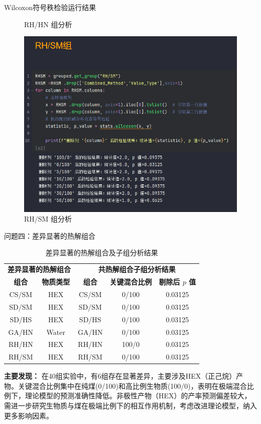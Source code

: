 \documentclass{beamer}
\begin{document}
\begin{frame}{Wilcoxon符号秩检验运行结果}
\begin{figure}[htbp]
\begin{minipage}{0.3\linewidth}
            \caption{RH/HN 组分析}
        \end{minipage}
        \begin{minipage}{0.3\linewidth}
            \centering
            \includegraphics[width=\linewidth]{pic/path_to_image7.png} %
            \caption{RH/SM 组分析}
        \end{minipage}        
    \end{figure}
\end{frame}


\begin{frame}{问题四：差异显著的热解组合}
\centering
\begin{table}[htbp]
\scriptsize
\setlength{\tabcolsep}{4pt}
\begin{tabular}{cc|ccc}
\toprule
\multicolumn{2}{c|}{\textbf{差异显著的热解组合}} & \multicolumn{3}{c}{\textbf{共热解组合子组分析结果}} \\
\cmidrule(r){1-2} \cmidrule(l){3-5}
\textbf{组合} & \textbf{物质类型} & \textbf{组合} & \textbf{关键混合比例} & \textbf{剔除后 $p$ 值} \\
\midrule
CS/SM & HEX & CS/SM & 0/100 & 0.03125 \\
SD/SM & HEX & SD/SM & 0/100 & 0.03125 \\
SD/HS & HEX & SD/HS & 0/100 & 0.03125 \\
GA/HN & Water & GA/HN & 0/100 & 0.03125 \\
RH/HN & HEX & RH/HN & 100/0 & 0.03125 \\
RH/SM & HEX & RH/SM & 0/100 & 0.03125 \\
\bottomrule
\end{tabular}
\caption{差异显著的热解组合及子组分析结果}
\label{tab:significance}
\end{table}
\justifying
\small
\textbf{主要发现：}
在\alert{40组}实验中，有\alert{6组}存在显著差异，主要涉及\alert{HEX（正己烷）}产物。关键混合比例集中在\alert{纯煤(0/100)}和\alert{高比例生物质(100/0)}，表明在\alert{极端混合比例}下，理论模型的预测准确性降低。非极性产物（HEX）的产率预测偏差较大，需进一步研究\alert{生物质与煤在极端比例下的相互作用机制}，考虑改进理论模型，纳入更多\alert{影响因素}。
\end{frame}
\end{document}
